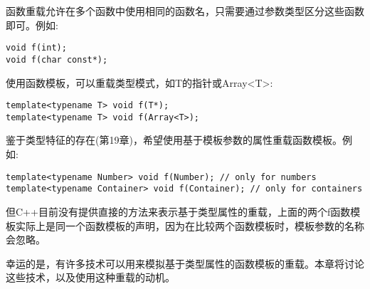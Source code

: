 
函数重载允许在多个函数中使用相同的函数名，只需要通过参数类型区分这些函数即可。例如:

\begin{lstlisting}[style=styleCXX]
void f(int);
void f(char const*);
\end{lstlisting}

使用函数模板，可以重载类型模式，如T的指针或Array<T>:

\begin{lstlisting}[style=styleCXX]
template<typename T> void f(T*);
template<typename T> void f(Array<T>);
\end{lstlisting}

鉴于类型特征的存在(第19章)，希望使用基于模板参数的属性重载函数模板。例如:

\begin{lstlisting}[style=styleCXX]
template<typename Number> void f(Number); // only for numbers
template<typename Container> void f(Container); // only for containers
\end{lstlisting}

但C++目前没有提供直接的方法来表示基于类型属性的重载，上面的两个f函数模板实际上是同一个函数模板的声明，因为在比较两个函数模板时，模板参数的名称会忽略。

幸运的是，有许多技术可以用来模拟基于类型属性的函数模板的重载。本章将讨论这些技术，以及使用这种重载的动机。






























